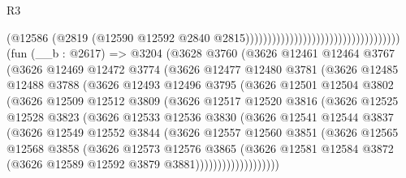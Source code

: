 \begin{lexlean}{R3}
\begin{coremodule}
                                                                    (@12586
                                                                      (@2819
                                                                        (@12590
                                                                          @12592
                                                                          @2840
                                                                          @2815)))))))))))))))))))))))))))))))))))
    (fun (__b : @2617) =>
    @3204
      (@3628
        @3760
        (@3626
          @12461
          @12464
          @3767
          (@3626
            @12469
            @12472
            @3774
            (@3626
              @12477
              @12480
              @3781
              (@3626
                @12485
                @12488
                @3788
                (@3626
                  @12493
                  @12496
                  @3795
                  (@3626
                    @12501
                    @12504
                    @3802
                    (@3626
                      @12509
                      @12512
                      @3809
                      (@3626
                        @12517
                        @12520
                        @3816
                        (@3626
                          @12525
                          @12528
                          @3823
                          (@3626
                            @12533
                            @12536
                            @3830
                            (@3626
                              @12541
                              @12544
                              @3837
                              (@3626
                                @12549
                                @12552
                                @3844
                                (@3626
                                  @12557
                                  @12560
                                  @3851
                                  (@3626
                                    @12565
                                    @12568
                                    @3858
                                    (@3626
                                      @12573
                                      @12576
                                      @3865
                                      (@3626
                                        @12581
                                        @12584
                                        @3872
                                        (@3626 @12589 @12592 @3879 @3881)))))))))))))))))))

\end{coremodule}
\end{lexlean}
